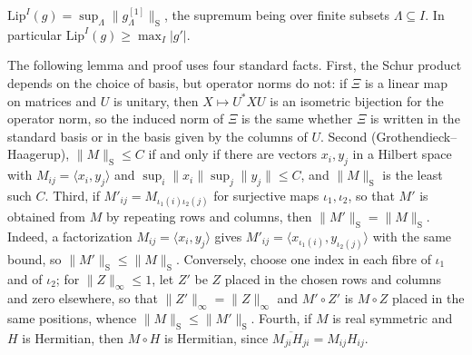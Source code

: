 \begin{lemma}\label{cont:lem:DK}
$\mathrm{Lip}^I(g)=\sup_\Lambda\|g^{[1]}_\Lambda\|_{\mathrm S}$, the supremum being over finite subsets $\Lambda\subseteq I$. In particular $\mathrm{Lip}^I(g)\geq\max_I|g'|$.
\end{lemma}

\begin{remark}\label{cont:rem:schur}
The following lemma and proof uses four standard facts. First, the Schur product depends on the choice of basis, but operator norms do not: if $\Xi$ is a linear map on matrices and $U$ is unitary, then $X\mapsto U^*XU$ is an isometric bijection for the operator norm, so the induced norm of $\Xi$ is the same whether $\Xi$ is written in the standard basis or in the basis given by the columns of $U$. Second (Grothendieck--Haagerup), $\|M\|_{\mathrm S}\leq C$ if and only if there are vectors $x_i,y_j$ in a Hilbert space with $M_{ij}=\langle x_i,y_j\rangle$ and $\sup_i\|x_i\|\sup_j\|y_j\|\leq C$, and $\|M\|_{\mathrm S}$ is the least such $C$. Third, if $M'_{ij}=M_{\iota_1(i)\iota_2(j)}$ for surjective maps $\iota_1,\iota_2$, so that $M'$ is obtained from $M$ by repeating rows and columns, then $\|M'\|_{\mathrm S}=\|M\|_{\mathrm S}$. Indeed, a factorization $M_{ij}=\langle x_i,y_j\rangle$ gives $M'_{ij}=\langle x_{\iota_1(i)},y_{\iota_2(j)}\rangle$ with the same bound, so $\|M'\|_{\mathrm S}\leq\|M\|_{\mathrm S}$. Conversely, choose one index in each fibre of $\iota_1$ and of $\iota_2$; for $\|Z\|_\infty\leq1$, let $Z'$ be $Z$ placed in the chosen rows and columns and zero elsewhere, so that $\|Z'\|_\infty=\|Z\|_\infty$ and $M'\circ Z'$ is $M\circ Z$ placed in the same positions, whence $\|M\|_{\mathrm S}\leq\|M'\|_{\mathrm S}$. Fourth, if $M$ is real symmetric and $H$ is Hermitian, then $M\circ H$ is Hermitian, since $\overline{M_{ji}H_{ji}}=M_{ij}H_{ij}$.
\end{remark}

